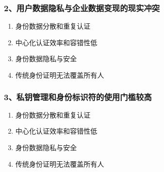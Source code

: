 \documentclass[11pt]{beamer}
\begin{document}
\begin{frame}
	\frametitle{2、用户数据隐私与企业数据变现的现实冲突}
	\begin{enumerate}
		\item 身份数据分散和重复认证
		\item 中心化认证效率和容错性低
		\item 身份数据隐私与安全
		\item 传统身份证明无法覆盖所有人
	\end{enumerate}
\end{frame}

\begin{frame}
	\frametitle{3、私钥管理和身份标识符的使用门槛较高}
	\begin{enumerate}
		\item 身份数据分散和重复认证
		\item 中心化认证效率和容错性低
		\item 身份数据隐私与安全
		\item 传统身份证明无法覆盖所有人
	\end{enumerate}
\end{frame}

%
%
%
\end{document}
